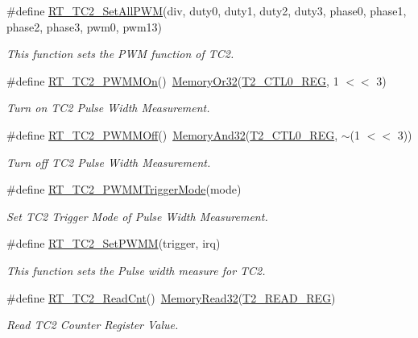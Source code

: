 \begin{DoxyCompactItemize}
\#define \mbox{\hyperlink{a00083_a49e7120e90142442bdd0744f61b572a5}{R\+T\+\_\+\+T\+C2\+\_\+\+Set\+All\+P\+WM}}(div,  duty0,  duty1,  duty2,  duty3,  phase0,  phase1,  phase2,  phase3,  pwm0,  pwm13)
\begin{DoxyCompactList}\small\item\em This function sets the P\+WM function of T\+C2. \end{DoxyCompactList}\item 
\#define \mbox{\hyperlink{a00083_a37ffb0b466d2a13bb9917a818b06776b}{R\+T\+\_\+\+T\+C2\+\_\+\+P\+W\+M\+M\+On}}()~\mbox{\hyperlink{a00026_a27874a97deab7cecdde5ddecf466e31e}{Memory\+Or32}}(\mbox{\hyperlink{a00026_a5853553391e986211306d4f29ab31e47}{T2\+\_\+\+C\+T\+L0\+\_\+\+R\+EG}}, 1 $<$$<$ 3)
\begin{DoxyCompactList}\small\item\em Turn on T\+C2 Pulse Width Measurement. \end{DoxyCompactList}\item 
\#define \mbox{\hyperlink{a00083_abe6d0acfd60eb7058f0622de867c5b87}{R\+T\+\_\+\+T\+C2\+\_\+\+P\+W\+M\+M\+Off}}()~\mbox{\hyperlink{a00026_ad87cedffcaadc51db22594fce55173d4}{Memory\+And32}}(\mbox{\hyperlink{a00026_a5853553391e986211306d4f29ab31e47}{T2\+\_\+\+C\+T\+L0\+\_\+\+R\+EG}}, $\sim$(1 $<$$<$ 3))
\begin{DoxyCompactList}\small\item\em Turn off T\+C2 Pulse Width Measurement. \end{DoxyCompactList}\item 
\#define \mbox{\hyperlink{a00083_a80f5ade258504a1243ccb058dd860475}{R\+T\+\_\+\+T\+C2\+\_\+\+P\+W\+M\+M\+Trigger\+Mode}}(mode)
\begin{DoxyCompactList}\small\item\em Set T\+C2 Trigger Mode of Pulse Width Measurement. \end{DoxyCompactList}\item 
\#define \mbox{\hyperlink{a00083_ad3b483689d5dd170a343222a71f43c9f}{R\+T\+\_\+\+T\+C2\+\_\+\+Set\+P\+W\+MM}}(trigger,  irq)
\begin{DoxyCompactList}\small\item\em This function sets the Pulse width measure for T\+C2. \end{DoxyCompactList}\item 
\#define \mbox{\hyperlink{a00083_a6591a513f367f6e7be0a90cb72aa3d49}{R\+T\+\_\+\+T\+C2\+\_\+\+Read\+Cnt}}()~\mbox{\hyperlink{a00026_a2d484dc15bdf30ee11ab3b05f31f0e16}{Memory\+Read32}}(\mbox{\hyperlink{a00026_ac9b4238c1829d1e3414db560a290e861}{T2\+\_\+\+R\+E\+A\+D\+\_\+\+R\+EG}})
\begin{DoxyCompactList}\small\item\em Read T\+C2 Counter Register Value. \end{DoxyCompactList}\end{DoxyCompactItemize}


